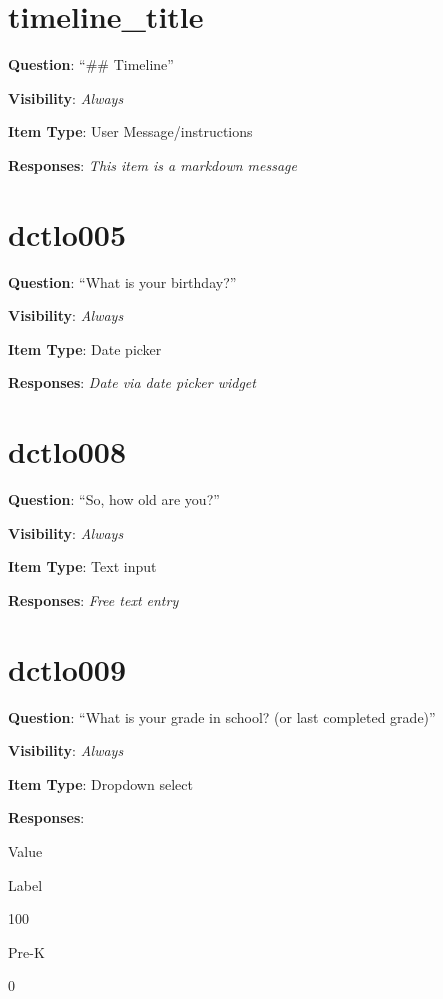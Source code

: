 \documentclass[]{book}
\begin{document}
\hypertarget{timeline_title}{%
\section{timeline\_title}\label{timeline_title}}

\textbf{Question}: ``\#\# Timeline''

\textbf{Visibility}: \emph{Always}

\textbf{Item Type}: User Message/instructions

\textbf{Responses}: \emph{This item is a markdown message}

\hypertarget{dctlo005}{%
\section{dctlo005}\label{dctlo005}}

\textbf{Question}: ``What is your birthday?''

\textbf{Visibility}: \emph{Always}

\textbf{Item Type}: Date picker

\textbf{Responses}: \emph{Date via date picker widget}

\hypertarget{dctlo008}{%
\section{dctlo008}\label{dctlo008}}

\textbf{Question}: ``So, how old are you?''

\textbf{Visibility}: \emph{Always}

\textbf{Item Type}: Text input

\textbf{Responses}: \emph{Free text entry}

\hypertarget{dctlo009}{%
\section{dctlo009}\label{dctlo009}}

\textbf{Question}: ``What is your grade in school? (or last completed grade)''

\textbf{Visibility}: \emph{Always}

\textbf{Item Type}: Dropdown select

\textbf{Responses}:

Value

Label

100

Pre-K

0
\end{document}
